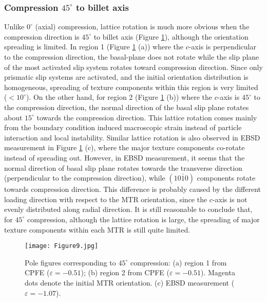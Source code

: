 \documentclass[review]{elsarticle}
\begin{document}
		\subsubsection{Compression \texorpdfstring{$45^{\circ}$}{TEXT} to billet axis}
		Unlike $0^{\circ}$ (axial) compression, lattice rotation is much more obvious when the compression direction is $45^{\circ}$ to billet axis (Figure \ref{fig:8}), although the orientation spreading is limited.
		In region 1 (Figure \ref{fig:8} (a)) where the $c$-axis is perpendicular to the compression direction, the basal-plane does not rotate while the slip plane of the most activated slip system rotates toward compression direction.
		Since only prismatic slip systems are activated, and the initial orientation distribution is homogeneous, spreading of texture components within this region is very limited ($<10^{\circ}$).
		On the other hand, for region 2 (Figure \ref{fig:8} (b)) where the $c$-axis is $45^{\circ}$ to the compression direction, the normal direction of the basal slip plane rotates about $15^{\circ}$ towards the compression direction.
		This lattice rotation comes mainly from the boundary condition induced macroscopic strain instead of particle interaction and local instability.
		Similar lattice rotation is also observed in EBSD measurement in Figure \ref{fig:8} (c), where the major texture components co-rotate instead of spreading out.
		However, in EBSD measurement, it seems that the normal direction of basal slip plane rotates towards the transverse direction (perpendicular to the compression direction), while $(10\bar{1}0)$ components rotate towards compression direction.
		This difference is probably caused by the different loading direction with respect to the MTR orientation, since the $c$-axis is not evenly distributed along radial direction.
		It is still reasonable to conclude that, for $45^{\circ}$ compression, although the lattice rotation is large, the spreading of major texture components within each MTR is still quite limited.
		\begin{figure}[!htb]
		\centering
		\texttt{[image: Figure9.jpg]}
		\caption{\label{fig:8}Pole figures corresponding to $45^{\circ}$ compression: (a) region 1 from CPFE ($\varepsilon =-0.51$); (b) region 2 from CPFE ($\varepsilon =-0.51$). Magenta dots denote the initial MTR orientation. (c) EBSD measurement ($\varepsilon =-1.07$).}
		\end{figure}
\end{document}
